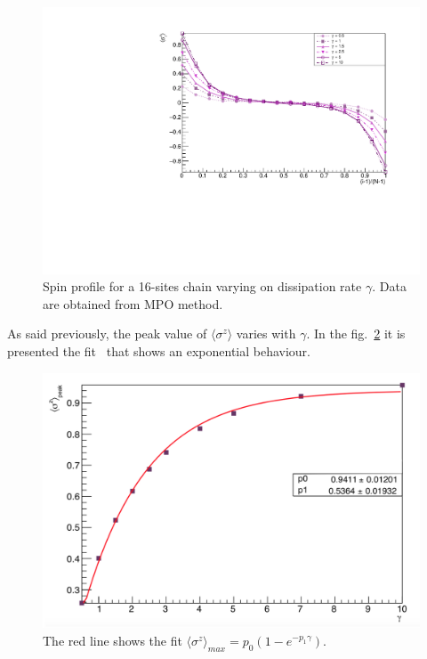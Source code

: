 \begin{figure}[H]
    \centering
    \includegraphics[scale=0.7]{Figures/16sites/16sites_LMvsGamma.pdf}
    \captionsetup{width=1.\linewidth}
    \caption{Spin profile for a 16-sites chain varying on dissipation rate $\gamma$. Data are obtained from MPO method.}
    \label{fig:16sites_LMvsGamma}
\end{figure}

As said previously, the peak value of $\langle\sigma^z\rangle$ varies with $\gamma$. In the fig.~\ref{fig:FIT_PeakLMvsGamma_J1051} it is presented the fit~\cite{root_cern} that shows an exponential behaviour. 

\begin{figure}[H]
    \centering
    \includegraphics[scale=0.5]{Figures/FIT_PeakLMVsGamma.png}
    \captionsetup{width=1.\linewidth}
    \caption{The red line shows the fit $\langle\sigma^z\rangle_{max} = p_0(1-e^{-p_1\gamma})$.}
    \label{fig:FIT_PeakLMvsGamma_J1051}
\end{figure}

